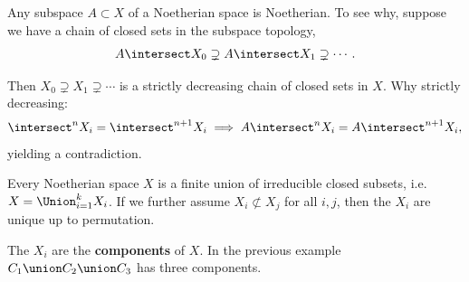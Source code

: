 \begin{remark}

Any subspace \(A\subset X\) of a Noetherian space is Noetherian. To see
why, suppose we have a chain of closed sets in the subspace topology,
\begin{align*}  
A\intersect X_0 \supsetneq A\intersect X_1 \supsetneq \cdots
.\end{align*}

Then \(X_0 \supsetneq X_1 \supsetneq \cdots\) is a strictly decreasing
chain of closed sets in \(X\). Why strictly decreasing:
\begin{align*}
\intersect^n X_i = \intersect^{n+1} X_i \implies A\intersect^n X_i = A\intersect^{n+1} X_i
,\end{align*} yielding a contradiction.

\end{remark}

\begin{proposition}

Every Noetherian space \(X\) is a finite union of irreducible closed
subsets, i.e.~\(X = \Union_{i=1}^k X_i\). If we further assume
\(X_i \not\subset X_j\) for all \(i, j\), then the \(X_i\) are unique up
to permutation.

\end{proposition}

\begin{remark}

The \(X_i\) are the \textbf{components} of \(X\). In the previous
example \(C_1 \union C_2 \union C_3\) has three components.

\end{remark}

